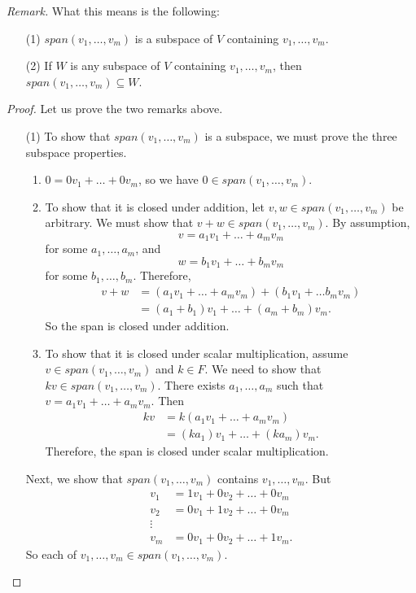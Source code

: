 \documentclass[11pt]{article}
\begin{document}
    \emph{Remark.} What this means is the following:
    \begin{enumerate}
        \item[(1)] \(span(v_1,\dots,v_m)\) is a subspace of $V$ containing \(v_1, \dots, v_m\).
        \item[(2)] If $W$ is any subspace of $V$ containing \(v_1, \dots, v_m\), then \(span(v_1, \dots, v_m) \subseteq W.\)  
    \end{enumerate}
    \begin{proof}
        Let us prove the two remarks above.
        \begin{enumerate}
            \item[(1)] To show that \(span(v_1, \dots, v_m)\) is a subspace, we must prove the three subspace properties.
            \begin{enumerate}
                \item \(0 = 0v_1 + \dots + 0 v_m\), so we have \(0 \in span(v_1, \dots, v_m)\).
                \item To show that it is closed under addition, let \(v,w \in span(v_1, \dots, v_m) \) be arbitrary. We must show that \(v + w \in span(v_1, \dots, v_m)\). By assumption, \[v = a_1 v_1 + \dots + a_m v_m\] for some \(a_1, \dots, a_m\), and \[w = b_1 v_1 + \dots + b_m v_m\] for some \(b_1, \dots, b_m\). Therefore,
                \begin{align*}
                    v + w &= (a_1 v_1 + \dots + a_m v_m) + (b_1 v_1 + \dots b_m v_m) \\
                          &= (a_1 + b_1) v_1 + \dots + (a_m + b_m) v_m.
                \end{align*}
                So the span is closed under addition. 
                \item To show that it is closed under scalar multiplication, assume \(v \in span(v_1, \dots, v_m)\) and \(k \in F\). We need to show that \(kv \in span(v_1, \dots, v_m).\) There exists \(a_1, \dots, a_m\) such that \(v = a_1 v_1 + \dots + a_m v_m\). Then 
                \begin{align*}
                    kv &= k(a_1v_1 + \dots + a_m v_m) \\
                       &= (ka_1)v_1 + \dots + (ka_m) v_m.
                \end{align*}
                Therefore, the span is closed under scalar multiplication.
            \end{enumerate}  
            Next, we show that \(span(v_1,\dots,v_m)\) contains \(v_1, \dots, v_m\). But
            \begin{align*}
                v_1 &= 1 v_1 + 0 v_2 + \dots + 0 v_m \\
                v_2 &= 0 v_1 + 1 v_2 + \dots + 0 v_m \\
                \vdots \\
                v_m &= 0 v_1 + 0 v_2 + \dots + 1 v_m.
            \end{align*}
            So each of \(v_1, \dots, v_m \in span(v_1, \dots, v_m).\)


\end{enumerate}
\end{proof}
\end{document}
